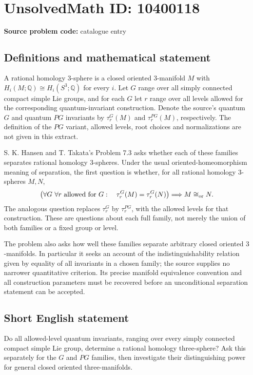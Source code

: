 \documentclass[11pt]{article}
\newcommand{\Q}{\mathbb{Q}}
\begin{document}
\section*{UnsolvedMath ID: 10400118}
\textbf{Source problem code:} catalogue entry
\subsection{Definitions and mathematical statement}
A rational homology \(3\)-sphere is a closed oriented \(3\)-manifold \(M\) with \(H_i(M;\Q)\cong H_i(S^3;\Q)\) for every \(i\). Let \(G\) range over all simply connected compact simple Lie groups, and for each \(G\) let \(r\) range over all levels allowed for the corresponding quantum-invariant construction. Denote the source's quantum \(G\) and quantum \(PG\) invariants by \(\tau_r^G(M)\) and \(\tau_r^{PG}(M)\), respectively. The definition of the \(PG\) variant, allowed levels, root choices and normalizations are not given in this extract.

S. K. Hansen and T. Takata's Problem 7.3 asks whether each of these families separates rational homology \(3\)-spheres. Under the usual oriented-homeomorphism meaning of separation, the first question is whether, for all rational homology \(3\)-spheres \(M,N\),
\[
 \left(\forall G\ \forall r\text{ allowed for }G:\quad
 \tau_r^G(M)=\tau_r^G(N)\right)
 \Longrightarrow M\cong_{\rm or}N.
\]
The analogous question replaces \(\tau_r^G\) by \(\tau_r^{PG}\), with the allowed levels for that construction. These are questions about each full family, not merely the union of both families or a fixed group or level.

The problem also asks how well these families separate arbitrary closed oriented \(3\)-manifolds. In particular it seeks an account of the indistinguishability relation given by equality of all invariants in a chosen family; the source supplies no narrower quantitative criterion. Its precise manifold equivalence convention and all construction parameters must be recovered before an unconditional separation statement can be accepted.
\subsection{Short English statement}
Do all allowed-level quantum invariants, ranging over every simply connected compact simple Lie group, determine a rational homology three-sphere? Ask this separately for the \(G\) and \(PG\) families, then investigate their distinguishing power for general closed oriented three-manifolds.
\end{document}
